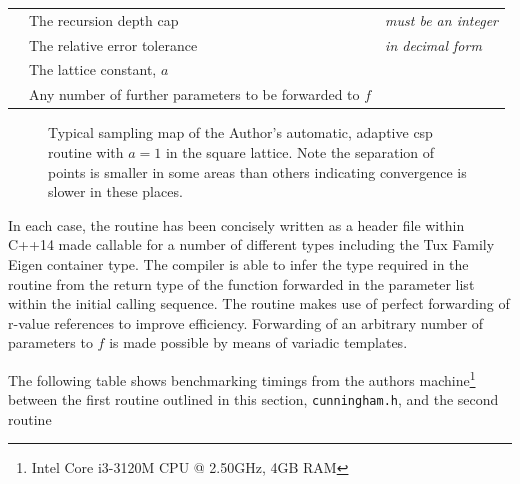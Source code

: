 \documentclass[a4paper, 12pt]{article}
\begin{document}
\begin{listliketab}
	\begin{tabular}{lll}
	\textbullet &The recursion depth cap &{\it must be an integer}\\
	\textbullet &The relative error tolerance &{\it in decimal form}\\
	\textbullet &The lattice constant, $a$ & \\
	\textbullet &Any number of further parameters to be forwarded to $f$&\\
	\end{tabular}
\end{listliketab}
\pgfplotsset{width=6.3in}
\pgfplotsset{height=6.3in}
\begin{figure}[H]
\caption{\footnotesize
	Typical sampling map of the Author's automatic, adaptive \gls{csp} routine with $a=1$ in the square lattice. Note the separation of points is smaller in some areas than others indicating convergence is slower in these places. }
\end{figure}
In each case, the routine has been concisely written as a header file within C++14 made callable for a number of different types including the Tux Family Eigen container type. The compiler is able to infer the type required in the routine from the return type of the function forwarded in the parameter list within the initial calling sequence. The routine makes use of perfect forwarding of r-value references to improve efficiency.
Forwarding of an arbitrary number of parameters to $f$ is made possible by means of variadic templates.

The following table shows benchmarking timings from the authors machine\footnote{Intel Core i3-3120M CPU @ 2.50GHz, 4GB RAM} between the first routine outlined in this section, {\tt cunningham.h}, and the second routine
\end{document}

